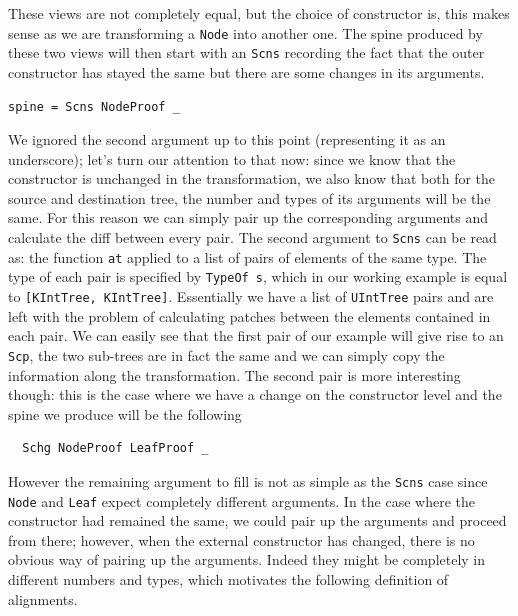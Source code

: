 \documentclass[11pt, titlepage]{article}
\newcommand{\toHaskell}[1]{\texttt{#1}\xspace}
\begin{document}
These views are not completely equal, but the choice of constructor is, this makes sense as we are transforming a \texttt{Node} into another one. The spine produced
by these two views will then start with an \texttt{Scns} recording the fact that 
the outer constructor has stayed the same but there are some changes in its 
arguments.

\begin{verbatim}
spine = Scns NodeProof _
\end{verbatim}

We ignored the second argument up to this point (representing it as an underscore); let's turn our attention to 
that now: since we know that the constructor is unchanged in the transformation, we also know that 
both for the source and destination tree, the number and types of its arguments 
will be the same. For this reason we can simply pair up the corresponding 
arguments and calculate the diff between every pair. The second argument to \texttt{Scns} can be read as: the function 
\texttt{at} applied to a list of pairs of elements of the same type. The type of each 
pair is specified by \texttt{TypeOf s}, which in our working example is equal to 
\toHaskell{[KIntTree, KIntTree]}. Essentially we have a list of \texttt{UIntTree} pairs and are left with the problem of calculating patches between the elements contained in 
each pair. 
We can easily see that the first pair of our example will give rise to an \texttt{Scp}, the two sub-trees are in fact the same and we can simply copy the information along the transformation. 
The second pair is more interesting though: this is the case where we have a change on the constructor level and the spine we produce will be the following

\begin{verbatim}
  Schg NodeProof LeafProof _
\end{verbatim}

However the remaining argument to fill is not as simple as the \texttt{Scns} case since \texttt{Node} and \texttt{Leaf} expect completely different 
arguments.
In the case where the constructor had remained the same, we could 
pair up the arguments and proceed from there; however, when the
external constructor has changed, there is no obvious way of pairing up
the arguments. Indeed they might be completely in different numbers and types, which 
motivates the following definition of alignments.
\end{document}
